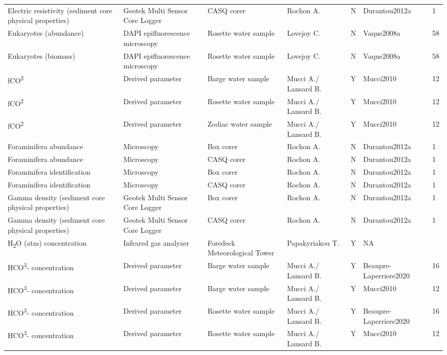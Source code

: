 \begin{ThreePartTable}
\begin{longtable}[t]{lllllll}
\addlinespace
Electric resistivity (sediment core physical properties) & Geotek Multi Sensor Core Logger & CASQ corer & Rochon A. & N & Durantou2012a & 1\\
Eukaryotes (abundance) & DAPI epifluorescence microscopy & Rosette water sample & Lovejoy C. & N & Vaque2008a & 58\\
Eukaryotes (biomass) & DAPI epifluorescence microscopy & Rosette water sample & Lovejoy C. & N & Vaque2008a & 58\\
fCO\textsuperscript{2} & Derived parameter & Barge water sample & Mucci A./ Lansard B. & Y & Mucci2010 & 12\\
fCO\textsuperscript{2} & Derived parameter & Rosette water sample & Mucci A./ Lansard B. & Y & Mucci2010 & 12\\
\addlinespace
fCO\textsuperscript{2} & Derived parameter & Zodiac water sample & Mucci A./ Lansard B. & Y & Mucci2010 & 12\\
Foraminifera abundance & Microscopy & Box corer & Rochon A. & N & Durantou2012a & 1\\
Foraminifera abundance & Microscopy & CASQ corer & Rochon A. & N & Durantou2012a & 1\\
Foraminifera identification & Microscopy & Box corer & Rochon A. & N & Durantou2012a & 1\\
Foraminifera identification & Microscopy & CASQ corer & Rochon A. & N & Durantou2012a & 1\\
\addlinespace
Gamma density (sediment core physical properties) & Geotek Multi Sensor Core Logger & Box corer & Rochon A. & N & Durantou2012a & 1\\
Gamma density (sediment core physical properties) & Geotek Multi Sensor Core Logger & CASQ corer & Rochon A. & N & Durantou2012a & 1\\
H\textsubscript{2}O (atm) concentration & Infrared gas analyzer & Foredeck Meteorological Tower & Papakyriakou T. & Y & NA & \\
HCO\textsuperscript{3}- concentration & Derived parameter & Barge water sample & Mucci A./ Lansard B. & Y & Beaupre-Laperriere2020 & 16\\
HCO\textsuperscript{3}- concentration & Derived parameter & Barge water sample & Mucci A./ Lansard B. & Y & Mucci2010 & 12\\
\addlinespace
HCO\textsuperscript{3}- concentration & Derived parameter & Rosette water sample & Mucci A./ Lansard B. & Y & Beaupre-Laperriere2020 & 16\\
HCO\textsuperscript{3}- concentration & Derived parameter & Rosette water sample & Mucci A./ Lansard B. & Y & Mucci2010 & 12\\

\end{longtable}
\end{ThreePartTable}
